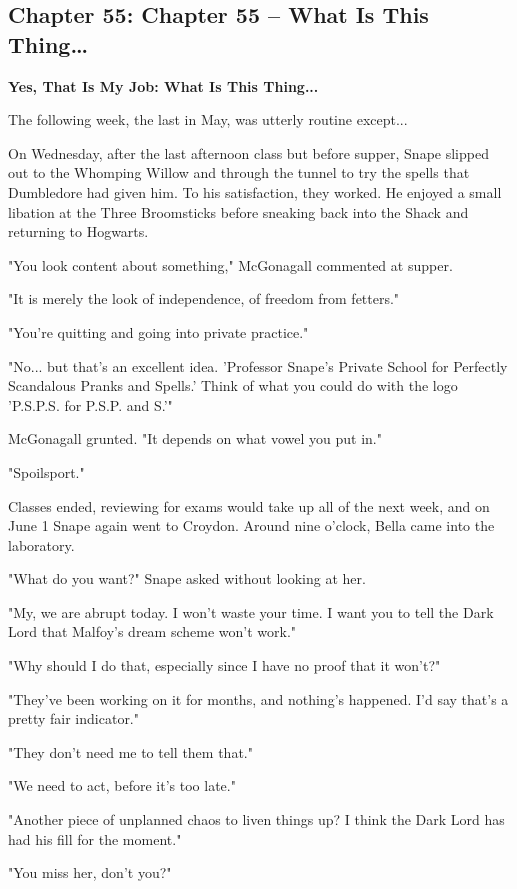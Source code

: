 \documentclass[a4paper,11pt]{article}
\begin{document}
\subsection{Chapter 55: Chapter 55 – What Is This Thing…}

\textbf{Yes, That Is My Job: What Is This Thing...}

The following week, the last in May, was utterly routine except...

On Wednesday, after the last afternoon class but before supper, Snape slipped out to the Whomping Willow and through the tunnel to try the spells that Dumbledore had given him. To his satisfaction, they worked. He enjoyed a small libation at the Three Broomsticks before sneaking back into the Shack and returning to Hogwarts.

"You look content about something," McGonagall commented at supper.

"It is merely the look of independence, of freedom from fetters."

"You're quitting and going into private practice."

"No... but that's an excellent idea. 'Professor Snape's Private School for Perfectly Scandalous Pranks and Spells.' Think of what you could do with the logo 'P.S.P.S. for P.S.P. and S.'"

McGonagall grunted. "It depends on what vowel you put in."

"Spoilsport."

Classes ended, reviewing for exams would take up all of the next week, and on June 1 Snape again went to Croydon. Around nine o'clock, Bella came into the laboratory.

"What do you want?" Snape asked without looking at her.

"My, we are abrupt today. I won't waste your time. I want you to tell the Dark Lord that Malfoy's dream scheme won't work."

"Why should I do that, especially since I have no proof that it won't?"

"They've been working on it for months, and nothing's happened. I'd say that's a pretty fair indicator."

"They don't need me to tell them that."

"We need to act, before it's too late."

"Another piece of unplanned chaos to liven things up? I think the Dark Lord has had his fill for the moment."

"You miss her, don't you?"
\end{document}

